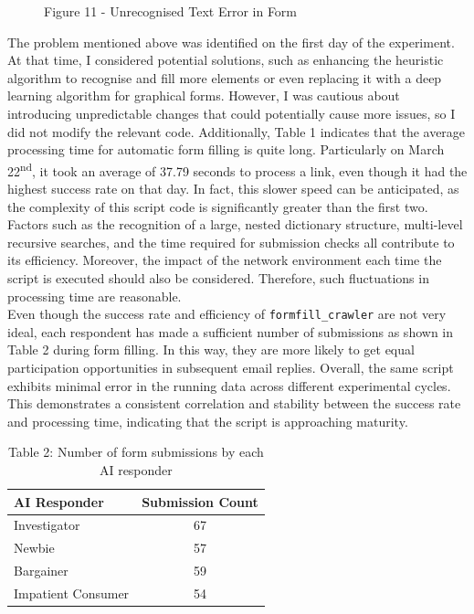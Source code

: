 \documentclass[ oneside,%
                    author={Cassie Qing Tang},
                    degree={BSc},
                     title={An Automated Response System for Disrupting Online Pet Scamming \\ },
                    subtitle={ }]{dissertation}
\begin{document}
\begin{figure}[H]
\begin{minipage}{0.45\textwidth}
        \caption{Figure 11 - Unrecognised Text Error in Form}
    \end{minipage}
\end{figure}

The problem mentioned above was identified on the first day of the experiment. At that time, I considered potential solutions, such as enhancing the heuristic algorithm to recognise and fill more elements or even replacing it with a deep learning algorithm for graphical forms. However, I was cautious about introducing unpredictable changes that could potentially cause more issues, so I did not modify the relevant code. Additionally, Table 1 indicates that the average processing time for automatic form filling is quite long. Particularly on March 22\textsuperscript{nd}, it took an average of 37.79 seconds to process a link, even though it had the highest success rate on that day. In fact, this slower speed can be anticipated, as the complexity of this script code is significantly greater than the first two. Factors such as the recognition of a large, nested dictionary structure, multi-level recursive searches, and the time required for submission checks all contribute to its efficiency. Moreover, the impact of the network environment each time the script is executed should also be considered. Therefore, such fluctuations in processing time are reasonable.
\\

Even though the success rate and efficiency of \texttt{formfill\_crawler} are not very ideal, each respondent has made a sufficient number of submissions as shown in Table 2 during form filling. In this way, they are more likely to get equal participation opportunities in subsequent email replies. Overall, the same script exhibits minimal error in the running data across different experimental cycles. This demonstrates a consistent correlation and stability between the success rate and processing time, indicating that the script is approaching maturity.
\begin{table}[ht]
\centering
\label{tab:ai_messages}
\begin{tabular}{@{}lc@{}}
\toprule
\textbf{AI Responder} & \textbf{Submission Count} \\
\midrule
Investigator & 67 \\
Newbie & 57 \\
Bargainer & 59 \\
Impatient Consumer & 54 \\
\bottomrule
\end{tabular}
\caption{Table 2: Number of form submissions by each AI responder}
\end{table}
\end{document}
